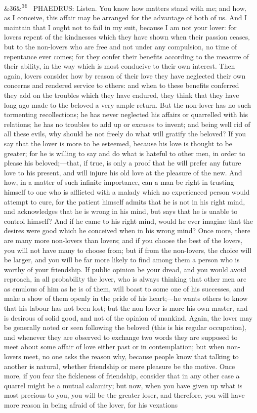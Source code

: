 \documentclass[12pt]{article}
\newcommand{\para}[1][]{\par\noindent\ifx&#1&\else\textsuperscript{\footnotesize #1}~\fi}
\begin{document}
\para[36] PHAEDRUS: Listen. You know how matters stand with me; and how, as I conceive, this affair may be arranged for the advantage of both of us. And I maintain that I ought not to fail in my suit, because I am not your lover: for lovers repent of the kindnesses which they have shown when their passion ceases, but to the non-lovers who are free and not under any compulsion, no time of repentance ever comes; for they confer their benefits according to the measure of their ability, in the way which is most conducive to their own interest. Then again, lovers consider how by reason of their love they have neglected their own concerns and rendered service to others: and when to these benefits conferred they add on the troubles which they have endured, they think that they have long ago made to the beloved a very ample return. But the non-lover has no such tormenting recollections; he has never neglected his affairs or quarrelled with his relations; he has no troubles to add up or excuses to invent; and being well rid of all these evils, why should he not freely do what will gratify the beloved? If you say that the lover is more to be esteemed, because his love is thought to be greater; for he is willing to say and do what is hateful to other men, in order to please his beloved;---that, if true, is only a proof that he will prefer any future love to his present, and will injure his old love at the pleasure of the new. And how, in a matter of such infinite importance, can a man be right in trusting himself to one who is afflicted with a malady which no experienced person would attempt to cure, for the patient himself admits that he is not in his right mind, and acknowledges that he is wrong in his mind, but says that he is unable to control himself? And if he came to his right mind, would he ever imagine that the desires were good which he conceived when in his wrong mind? Once more, there are many more non-lovers than lovers; and if you choose the best of the lovers, you will not have many to choose from; but if from the non-lovers, the choice will be larger, and you will be far more likely to find among them a person who is worthy of your friendship. If public opinion be your dread, and you would avoid reproach, in all probability the lover, who is always thinking that other men are as emulous of him as he is of them, will boast to some one of his successes, and make a show of them openly in the pride of his heart;---he wants others to know that his labour has not been lost; but the non-lover is more his own master, and is desirous of solid good, and not of the opinion of mankind. Again, the lover may be generally noted or seen following the beloved (this is his regular occupation), and whenever they are observed to exchange two words they are supposed to meet about some affair of love either past or in contemplation; but when non-lovers meet, no one asks the reason why, because people know that talking to another is natural, whether friendship or mere pleasure be the motive. Once more, if you fear the fickleness of friendship, consider that in any other case a quarrel might be a mutual calamity; but now, when you have given up what is most precious to you, you will be the greater loser, and therefore, you will have more reason in being afraid of the lover, for his vexations 
\end{document}
